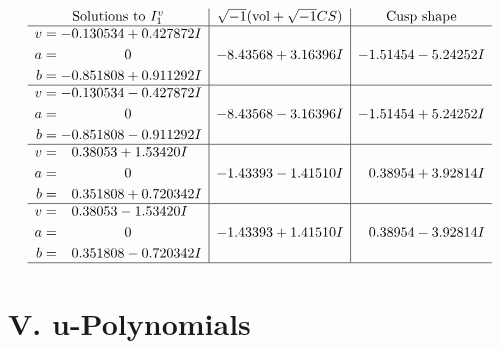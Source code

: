 \documentclass[1p]{elsarticle_modified}
\theoremstyle{definition}
\newcommand{\I}{\sqrt{-1}}
\begin{document}
$$\begin{array}{c|c|c}  
\text{Solutions to }I^v_{1}& \I (\text{vol} + \sqrt{-1}CS) & \text{Cusp shape}\\
 \hline 
\begin{aligned}
v &= -0.130534 + 0.427872 I \\
a &= \phantom{-0.000000 } 0 \\
b &= -0.851808 + 0.911292 I\end{aligned}
 & -8.43568 + 3.16396 I & -1.51454 - 5.24252 I \\ \hline\begin{aligned}
v &= -0.130534 - 0.427872 I \\
a &= \phantom{-0.000000 } 0 \\
b &= -0.851808 - 0.911292 I\end{aligned}
 & -8.43568 - 3.16396 I & -1.51454 + 5.24252 I \\ \hline\begin{aligned}
v &= \phantom{-}0.38053 + 1.53420 I \\
a &= \phantom{-0.000000 } 0 \\
b &= \phantom{-}0.351808 + 0.720342 I\end{aligned}
 & -1.43393 - 1.41510 I & \phantom{-}0.38954 + 3.92814 I \\ \hline\begin{aligned}
v &= \phantom{-}0.38053 - 1.53420 I \\
a &= \phantom{-0.000000 } 0 \\
b &= \phantom{-}0.351808 - 0.720342 I\end{aligned}
 & -1.43393 + 1.41510 I & \phantom{-}0.38954 - 3.92814 I\\
 \hline 
 \end{array}$$\newpage
\newpage\renewcommand{\arraystretch}{1}
\centering \section*{ V. u-Polynomials}
\end{document}
